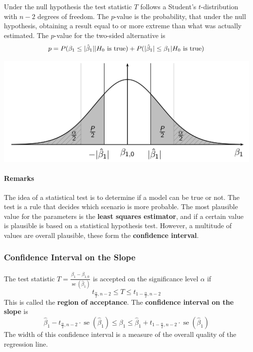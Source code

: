 \documentclass[11pt]{article}
\theoremstyle{definition}
\newcommand*\se[1]{\mathop{\text{se}}\left(#1\right)}
\DeclarePairedDelimiter\abs{\lvert}{\rvert}
\begin{document}
Under the null hypothesis the test statistic $T$ follows a Student's $t$-distribution with $n-2$ degrees of freedom. The $p$-value is the probability, that under the null hypothesis, obtaining a result equal to or more extreme than what was actually estimated. The $p$-value for the two-sided alternative is
\begin{equation*}
	p = P(\beta_1 \leq \abs{\hat{\beta}_1} | H_0\text{ is true}) + P(\abs{\hat{\beta}_1} \leq \beta_1 | H_0\text{ is true})
\end{equation*}
\begin{center}
	\includegraphics[width=0.8\linewidth]{img/p_value}
\end{center}

\paragraph{Remarks} The idea of a statistical test is to determine if a model can be true or not. The test is a rule that decides which scenario is more probable. The most plausible value for the parameters is the \textbf{least squares estimator}, and if a certain value is plausible is based on a statistical hypothesis test. However, a multitude of values are overall plausible, these form the \textbf{confidence interval}.

\subsubsection{Confidence Interval on the Slope}
The test statistic $ T = \frac{\hat{\beta}_1 - \beta_{1,0}}{\se{\hat{\beta}_1}}$ is accepted on the significance level $\alpha$ if
\begin{equation*}
	t_{\frac{\alpha}{2}, n-2} \leq T \leq t_{1 - \frac{\alpha}{2}, n-2}
\end{equation*}
This is called the \textbf{region of acceptance}. The \textbf{confidence interval on the slope} is
\begin{equation*}
	\hat{\beta}_1 - t_{\frac{\alpha}{2}, n-2}\cdot\se{\hat{\beta}_1} \leq \beta_1 \leq \hat{\beta}_1 + t_{1-\frac{\alpha}{2}, n-2}\cdot\se{\hat{\beta}_1}
\end{equation*}
The width of this confidence interval is a measure of the overall quality of the regression line.
\end{document}
